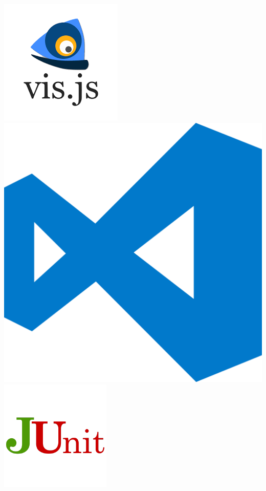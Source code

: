 \documentclass[10pt]{beamer}
\begin{document}
\begin{frame}
\includegraphics[trim={0, 0, 0, 0}, clip, scale=0.5]{img/visJSLogo.png}
\includegraphics[trim={0, 0, 0, 0}, clip, scale=0.05]{img/visualStudioCodeLogo.png}
\includegraphics[trim={0, 0, 0, 0}, clip, scale=0.5]{img/junit.png}
\end{frame}
\end{document}

